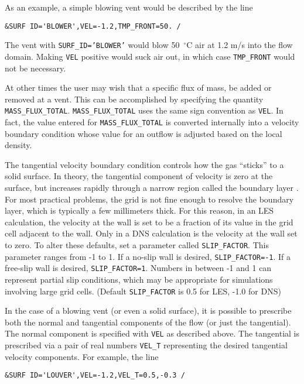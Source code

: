 \documentclass[11pt]{book}
\newcommand{\ct}{\tt\small}
\begin{document}
As an example, a simple blowing vent would be described by the line

\footnotesize
\begin{verbatim}
&SURF ID='BLOWER',VEL=-1.2,TMP_FRONT=50. /
\end{verbatim}
\normalsize

\noindent
The vent with {\ct SURF\_ID='BLOWER'} would blow 50~$^\circ$C
air at 1.2 m/s into the flow domain. Making {\ct VEL} positive would
suck air out, in which case {\ct TMP\_FRONT} would not be necessary.

At other times the user may wish that a specific flux of mass, be added or removed at
a vent.  This can be accomplished by specifying the quantity {\ct MASS\_FLUX\_TOTAL}.
{\ct MASS\_FLUX\_TOTAL} uses the same sign convention as {\ct VEL}.  In fact, the value entered for
{\ct MASS\_FLUX\_TOTAL} is converted internally into a velocity boundary condition whose value
for an outflow is adjusted based on the local density.

The tangential velocity boundary condition controls how the gas
``sticks'' to a solid surface. In theory, the tangential component of
velocity is zero at the surface, but
increases rapidly through a narrow region called the boundary layer .
For most practical problems, the grid is not fine enough to resolve the
boundary layer, which is typically a few millimeters thick.
For this reason, in an LES calculation, the velocity at the wall
is set to be a fraction of its value in the grid cell adjacent to the
wall. Only in a DNS calculation is the velocity at the wall set to zero.
To alter these defaults, set a parameter called
{\ct SLIP\_FACTOR}. This parameter ranges from -1 to 1. If a no-slip wall is
desired, {\ct SLIP\_FACTOR=-1}. If a free-slip wall is desired, {\ct SLIP\_FACTOR=1}.
Numbers in between -1 and 1 can represent partial slip conditions,
which may be appropriate for simulations involving large grid cells.
(Default {\ct SLIP\_FACTOR} is 0.5 for LES, -1.0 for DNS)

In the case of a blowing vent (or even a solid surface),
it is possible to prescribe both the normal and tangential components of the flow (or just the tangential).
The normal component is specified with {\ct VEL} as described above. The tangential is prescribed
via a pair of real numbers {\ct VEL\_T} representing the desired tangential
velocity components. For example, the line

\footnotesize
\begin{verbatim}
&SURF ID='LOUVER',VEL=-1.2,VEL_T=0.5,-0.3 /
\end{verbatim}
\normalsize
\end{document}
